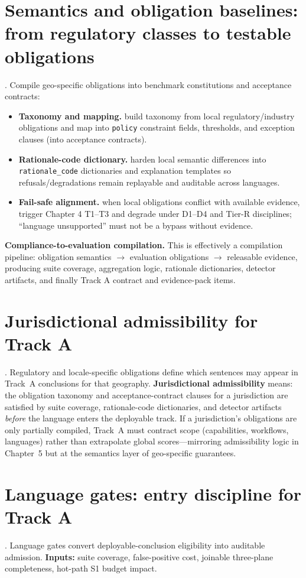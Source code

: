 \documentclass[11pt,a4paper]{report}
\begin{document}
\section{Semantics and obligation baselines: from regulatory classes to testable obligations}
\EvalFramework{}. Compile geo-specific obligations into benchmark constitutions and acceptance contracts:
\begin{itemize}
  \item \textbf{Taxonomy and mapping.} build taxonomy from local regulatory/industry obligations and map into \texttt{policy} constraint fields, thresholds, and exception clauses (into acceptance contracts).
  \item \textbf{Rationale-code dictionary.} harden local semantic differences into \texttt{rationale\_code} dictionaries and explanation templates so refusals/degradations remain replayable and auditable across languages.
  \item \textbf{Fail-safe alignment.} when local obligations conflict with available evidence, trigger Chapter 4 T1--T3 and degrade under D1--D4 and Tier-R disciplines; “language unsupported” must not be a bypass without evidence.
\end{itemize}

\noindent\textbf{Compliance-to-evaluation compilation.} This is effectively a compilation pipeline: obligation semantics $\rightarrow$ evaluation obligations $\rightarrow$ releasable evidence, producing suite coverage, aggregation logic, rationale dictionaries, detector artifacts, and finally Track A contract and evidence-pack items.

\section{Jurisdictional admissibility for Track A}
\EvalFramework{}. Regulatory and locale-specific obligations define which sentences may appear in Track~A conclusions for that geography. \textbf{Jurisdictional admissibility} means: the obligation taxonomy and acceptance-contract clauses for a jurisdiction are satisfied by suite coverage, rationale-code dictionaries, and detector artifacts \emph{before} the language enters the deployable track. If a jurisdiction’s obligations are only partially compiled, Track~A must contract scope (capabilities, workflows, languages) rather than extrapolate global scores---mirroring admissibility logic in Chapter~5 but at the semantics layer of geo-specific guarantees.

\section{Language gates: entry discipline for Track A}
\EvalFramework{}. Language gates convert deployable-conclusion eligibility into auditable admission. \textbf{Inputs:} suite coverage, false-positive cost, joinable three-plane completeness, hot-path S1 budget impact.
\end{document}
